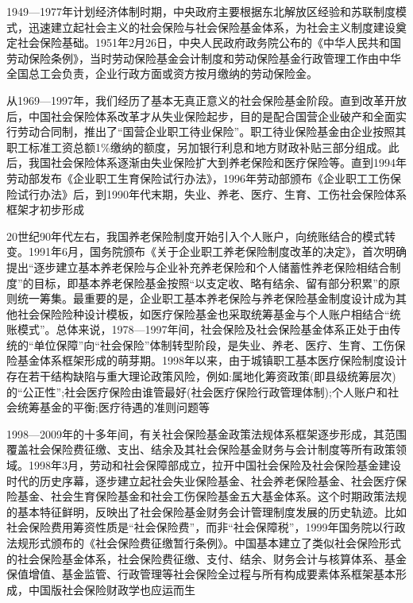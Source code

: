 \documentclass{ctexart}
\begin{document}
1949—1977年计划经济体制时期，中央政府主要根据东北解放区经验和苏联制度模式，迅速建立起社会主义的社会保险与社会保险基金体系，为社会主义制度建设奠定社会保险基础。1951年2月26日，中央人民政府政务院公布的《中华人民共和国劳动保险条例》，当时劳动保险基金会计制度和劳动保险基金行政管理工作由中华全国总工会负责，企业行政方面或资方按月缴纳的劳动保险金。

从1969—1997年，我们经历了基本无真正意义的社会保险基金阶段。直到改革开放后，中国社会保险体系改革才从失业保险起步，目的是配合国营企业破产和全面实行劳动合同制，推出了“国营企业职工待业保险”。职工待业保险基金由企业按照其职工标准工资总额1\%缴纳的额度，另加银行利息和地方财政补贴三部分组成。此后，我国社会保险体系逐渐由失业保险扩大到养老保险和医疗保险等。直到1994年劳动部发布《企业职工生育保险试行办法》，1996年劳动部颁布《企业职工工伤保险试行办法》后，到1990年代末期，失业、养老、医疗、生育、工伤社会保险体系框架才初步形成

20世纪90年代左右，我国养老保险制度开始引入个人账户，向统账结合的模式转变。1991年6月，国务院颁布《关于企业职工养老保险制度改革的决定》，首次明确提出“逐步建立基本养老保险与企业补充养老保险和个人储蓄性养老保险相结合制度”的目标，即基本养老保险基金按照“以支定收、略有结余、留有部分积累”的原则统一筹集。最重要的是，企业职工基本养老保险与养老保险基金制度设计成为其他社会保险险种设计模板，如医疗保险基金也采取统筹基金与个人账户相结合“统账模式”。总体来说，1978—1997年间，社会保险及社会保险基金体系正处于由传统的“单位保障”向“社会保险”体制转型阶段，是失业、养老、医疗、生育、工伤保险基金体系框架形成的萌芽期。1998年以来，由于城镇职工基本医疗保险制度设计存在若干结构缺陷与重大理论政策风险，例如:属地化筹资政策(即县级统筹层次)的“公正性”;社会医疗保险由谁管最好(社会医疗保险行政管理体制);个人账户和社会统筹基金的平衡;医疗待遇的准则问题等

1998—2009年的十多年间，有关社会保险基金政策法规体系框架逐步形成，其范围覆盖社会保险费征缴、支出、结余及其社会保险基金财务与会计制度等所有政策领域。1998年3月，劳动和社会保障部成立，拉开中国社会保险及社会保险基金建设时代的历史序幕，逐步建立起社会失业保险基金、社会养老保险基金、社会医疗保险基金、社会生育保险基金和社会工伤保险基金五大基金体系。这个时期政策法规的基本特征鲜明，反映出了社会保险基金财务会计管理制度发展的历史轨迹。比如社会保险费用筹资性质是“社会保险费”，而非“社会保障税”，1999年国务院以行政法规形式颁布的《社会保险费征缴暂行条例》。中国基本建立了类似社会保险形式的社会保险基金体系，社会保险费征缴、支付、结余、财务会计与核算体系、基金保值增值、基金监管、行政管理等社会保险全过程与所有构成要素体系框架基本形成，中国版社会保险财政学也应运而生
\end{document}
